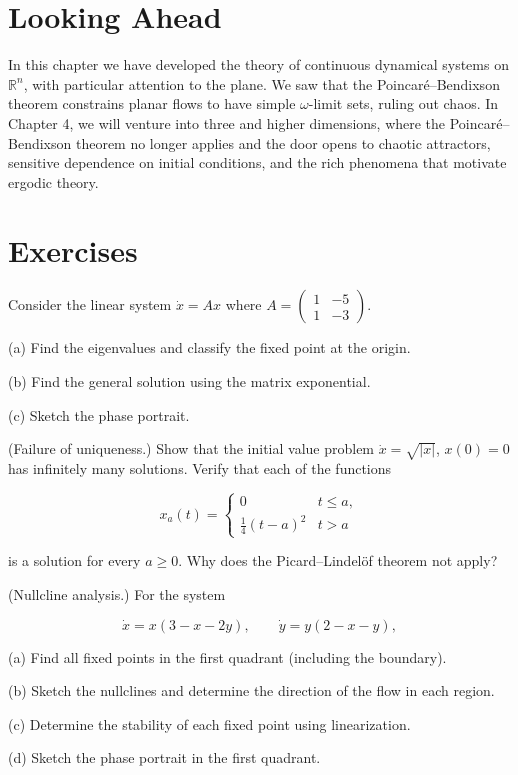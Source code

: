 \section{Looking Ahead}\label{sec:3.8}

In this chapter we have developed the theory of continuous dynamical systems on $\mathbb{R}^n$, with particular attention to the plane. We saw that the Poincar\'e--Bendixson theorem constrains planar flows to have simple $\omega$-limit sets, ruling out chaos. In Chapter 4, we will venture into three and higher dimensions, where the Poincar\'e--Bendixson theorem no longer applies and the door opens to chaotic attractors, sensitive dependence on initial conditions, and the rich phenomena that motivate ergodic theory.


\bigskip


\section*{Exercises}

\begin{exercise}
Consider the linear system $\dot{x} = Ax$ where $A = \begin{pmatrix} 1 & -5 \\ 1 & -3 \end{pmatrix}$.

(a) Find the eigenvalues and classify the fixed point at the origin.

(b) Find the general solution using the matrix exponential.

(c) Sketch the phase portrait.
\end{exercise}


\begin{exercise}
(Failure of uniqueness.) Show that the initial value problem $\dot{x} = \sqrt{|x|}$, $x(0) = 0$ has infinitely many solutions. Verify that each of the functions

\[
x_a(t) = \begin{cases} 0 & t \leq a, \\ \frac{1}{4}(t - a)^2 & t > a \end{cases}
\]

is a solution for every $a \geq 0$. Why does the Picard--Lindel\"of theorem not apply?
\end{exercise}


\begin{exercise}
(Nullcline analysis.) For the system

\[
\dot{x} = x(3 - x - 2y), \qquad \dot{y} = y(2 - x - y),
\]

(a) Find all fixed points in the first quadrant (including the boundary).

(b) Sketch the nullclines and determine the direction of the flow in each region.

(c) Determine the stability of each fixed point using linearization.

(d) Sketch the phase portrait in the first quadrant.
\end{exercise}


